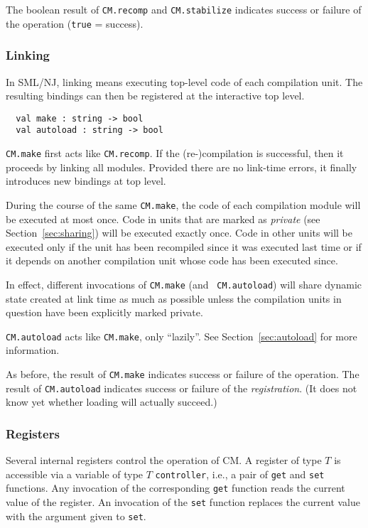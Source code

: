 \documentclass{article}
\begin{document}
The boolean result of {\tt CM.recomp} and {\tt CM.stabilize} indicates
success or failure of the operation ({\tt true} = success).

\subsubsection*{Linking}

In SML/NJ, linking means executing top-level code of each compilation
unit.  The resulting bindings can then be registered at the interactive top
level.

\begin{verbatim}
  val make : string -> bool
  val autoload : string -> bool
\end{verbatim}

{\tt CM.make} first acts like {\tt CM.recomp}.  If the (re-)compilation
is successful, then it proceeds by linking all modules.  Provided
there are no link-time errors, it finally introduces new bindings at
top level.

During the course of the same {\tt CM.make}, the code of each
compilation module will be executed at most once.  Code in units that
are marked as {\it private} (see Section~\ref{sec:sharing}) will be
executed exactly once.  Code in other units will be executed only if
the unit has been recompiled since it was executed last time or if it
depends on another compilation unit whose code has been executed
since.

In effect, different invocations of {\tt CM.make} (and {\tt
CM.autoload}) will share dynamic state created at link time as much as
possible unless the compilation units in question have been explicitly
marked private.

{\tt CM.autoload} acts like {\tt CM.make}, only ``lazily''. See
Section~\ref{sec:autoload} for more information.

As before, the result of {\tt CM.make} indicates success or failure of
the operation.  The result of {\tt CM.autoload} indicates success or
failure of the {\em registration}.  (It does not know yet whether
loading will actually succeed.)

\subsubsection*{Registers}

Several internal registers control the operation of CM.  A register of
type $T$ is accessible via a variable of type $T$ {\tt controller},
i.e., a pair of {\tt get} and {\tt set} functions.  Any invocation of
the corresponding {\tt get} function reads the current value of the
register.  An invocation of the {\tt set} function replaces the
current value with the argument given to {\tt set}.
\end{document}
